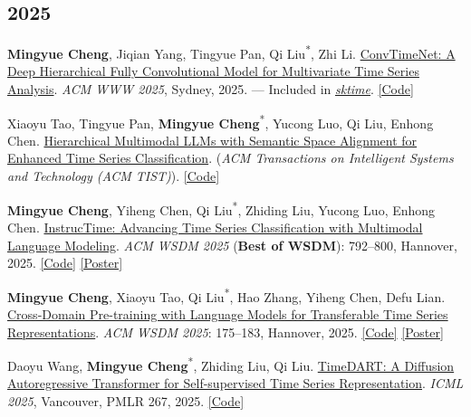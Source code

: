 \documentclass[UTF8,fontset=fandol,scheme=plain,11pt,a4paper]{ctexart}
\newcommand{\pubentry}[1]{\item \begin{minipage}[t]{\linewidth}#1\end{minipage}}
\begin{document}
\subsection{2025}
\begin{publist}[start=31]
\pubentry{\textbf{Mingyue Cheng}, Jiqian Yang, Tingyue Pan, Qi Liu\textsuperscript{*}, Zhi Li. \href{https://arxiv.org/pdf/2403.01493}{ConvTimeNet: A Deep Hierarchical Fully Convolutional Model for Multivariate Time Series Analysis}. \emph{ACM WWW 2025}, Sydney, 2025. --- Included in \href{https://www.sktime.net/en/stable/}{\emph{sktime}}. \href{https://github.com/Mingyue-Cheng/ConvTimeNet}{[Code]}}

\pubentry{Xiaoyu Tao, Tingyue Pan, \textbf{Mingyue Cheng}\textsuperscript{*}, Yucong Luo, Qi Liu, Enhong Chen. \href{https://arxiv.org/pdf/2410.18686}{Hierarchical Multimodal LLMs with Semantic Space Alignment for Enhanced Time Series Classification}. (\emph{ACM Transactions on Intelligent Systems and Technology (ACM TIST)}). \href{https://github.com/Xiaoyu-Tao/HiTime}{[Code]}}

\pubentry{\textbf{Mingyue Cheng}, Yiheng Chen, Qi Liu\textsuperscript{*}, Zhiding Liu, Yucong Luo, Enhong Chen. \href{https://dl.acm.org/doi/abs/10.1145/3701551.3703499}{InstrucTime: Advancing Time Series Classification with Multimodal Language Modeling}. \emph{ACM WSDM 2025} (\textbf{Best of WSDM}): 792--800, Hannover, 2025. \href{https://github.com/Mingyue-Cheng/InstructTime}{[Code]} \href{https://mingyue-cheng.github.io/files/posters/instructtime\_poster.pdf}{[Poster]}}

\pubentry{\textbf{Mingyue Cheng}, Xiaoyu Tao, Qi Liu\textsuperscript{*}, Hao Zhang, Yiheng Chen, Defu Lian. \href{https://arxiv.org/pdf/2403.12372.pdf}{Cross-Domain Pre-training with Language Models for Transferable Time Series Representations}. \emph{ACM WSDM 2025}: 175--183, Hannover, 2025. \href{https://github.com/Mingyue-Cheng/CrossTimeNet}{[Code]} \href{https://mingyue-cheng.github.io/files/posters/crosstimenet-poster.pdf}{[Poster]}}

\pubentry{Daoyu Wang, \textbf{Mingyue Cheng}\textsuperscript{*}, Zhiding Liu, Qi Liu. \href{https://arxiv.org/html/2410.05711v1}{TimeDART: A Diffusion Autoregressive Transformer for Self-supervised Time Series Representation}. \emph{ICML 2025}, Vancouver, PMLR 267, 2025. \href{https://github.com/Melmaphother/TimeDART}{[Code]}}


\end{publist}
\end{document}
